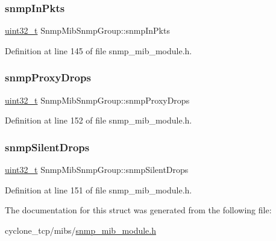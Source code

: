 \subsubsection{\texorpdfstring{snmp\+In\+Pkts}{snmpInPkts}}
{\footnotesize\ttfamily \hyperlink{stdint_8h_a435d1572bf3f880d55459d9805097f62}{uint32\+\_\+t} Snmp\+Mib\+Snmp\+Group\+::snmp\+In\+Pkts}



Definition at line 145 of file snmp\+\_\+mib\+\_\+module.\+h.

\mbox{\label{structSnmpMibSnmpGroup_ac011afb11f94e119fc8c890604b55902}} 
\subsubsection{\texorpdfstring{snmp\+Proxy\+Drops}{snmpProxyDrops}}
{\footnotesize\ttfamily \hyperlink{stdint_8h_a435d1572bf3f880d55459d9805097f62}{uint32\+\_\+t} Snmp\+Mib\+Snmp\+Group\+::snmp\+Proxy\+Drops}



Definition at line 152 of file snmp\+\_\+mib\+\_\+module.\+h.

\mbox{\label{structSnmpMibSnmpGroup_acc45dad5896027bc5abcfc83a4bab3b7}} 
\subsubsection{\texorpdfstring{snmp\+Silent\+Drops}{snmpSilentDrops}}
{\footnotesize\ttfamily \hyperlink{stdint_8h_a435d1572bf3f880d55459d9805097f62}{uint32\+\_\+t} Snmp\+Mib\+Snmp\+Group\+::snmp\+Silent\+Drops}



Definition at line 151 of file snmp\+\_\+mib\+\_\+module.\+h.



The documentation for this struct was generated from the following file\+:\begin{DoxyCompactItemize}
\item 
cyclone\+\_\+tcp/mibs/\hyperlink{snmp__mib__module_8h}{snmp\+\_\+mib\+\_\+module.\+h}\end{DoxyCompactItemize}
